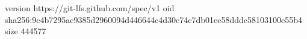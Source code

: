 version https://git-lfs.github.com/spec/v1
oid sha256:9c4b7295ac9385d2960094d446644c4d30c74c7db01ee58dddc58103100e55b4
size 444577
